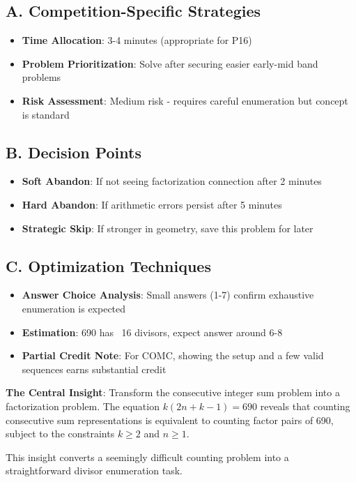 \documentclass[11pt]{article}
\begin{document}
\begin{competitionbox}
\subsection*{A. Competition-Specific Strategies}
\begin{itemize}[leftmargin=*]
    \item \textbf{Time Allocation}: 3-4 minutes (appropriate for P16)
    \item \textbf{Problem Prioritization}: Solve after securing easier early-mid band problems
    \item \textbf{Risk Assessment}: Medium risk - requires careful enumeration but concept is standard
\end{itemize}

\subsection*{B. Decision Points}
\begin{itemize}[leftmargin=*]
    \item \textbf{Soft Abandon}: If not seeing factorization connection after 2 minutes
    \item \textbf{Hard Abandon}: If arithmetic errors persist after 5 minutes
    \item \textbf{Strategic Skip}: If stronger in geometry, save this problem for later
\end{itemize}

\subsection*{C. Optimization Techniques}
\begin{itemize}[leftmargin=*]
    \item \textbf{Answer Choice Analysis}: Small answers (1-7) confirm exhaustive enumeration is expected
    \item \textbf{Estimation}: 690 has ~16 divisors, expect answer around 6-8
    \item \textbf{Partial Credit Note}: For COMC, showing the setup and a few valid sequences earns substantial credit
\end{itemize}
\end{competitionbox}

\begin{keyinsightbox}
\textbf{The Central Insight}: Transform the consecutive integer sum problem into a factorization problem. The equation $k(2n+k-1) = 690$ reveals that counting consecutive sum representations is equivalent to counting factor pairs of 690, subject to the constraints $k \geq 2$ and $n \geq 1$.

This insight converts a seemingly difficult counting problem into a straightforward divisor enumeration task.
\end{keyinsightbox}
\end{document}
